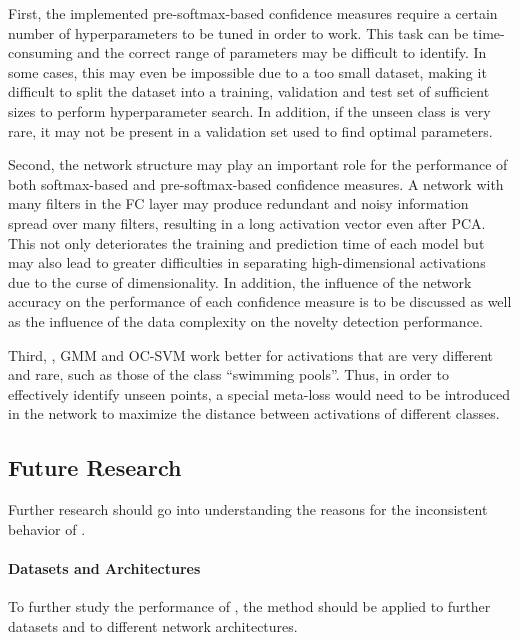\documentclass[10pt]{article}
\begin{document}
\label{subsec:limitaitons}
First, the implemented pre-softmax-based confidence measures require a certain number of hyperparameters to be tuned in order to work. This task can be time-consuming and the correct range of parameters may be difficult to identify. In some cases, this may even be impossible due to a too small dataset, making it difficult to split the dataset into a training, validation and test set of sufficient sizes to perform hyperparameter search. In addition, if the unseen class is very rare, it may not be present in a validation set used to find optimal parameters.

Second, the network structure may play an important role for the performance of both softmax-based and pre-softmax-based confidence measures. A network with many filters in the \gls{FC} layer may produce redundant and noisy information spread over many filters, resulting in a long activation vector even after \gls{PCA}. This not only deteriorates the training and prediction time of each model but may also lead to greater difficulties in separating high-dimensional activations due to the curse of dimensionality. In addition, the influence of the network accuracy on the performance of each confidence measure is to be discussed as well as the influence of the data complexity on the novelty detection performance.

Third, , \gls{GMM} and \gls{OC-SVM} work better for activations that are very different and rare, such as those of the class ``swimming pools''. Thus, in order to effectively identify unseen points, a special meta-loss would need to be introduced in the network to maximize the distance between activations of different classes.


\subsection{Future Research}
\label{subsec:future_research}

Further research should go into understanding the reasons for the inconsistent behavior of . 

\paragraph{Datasets and Architectures} To further study the performance of , the method should be applied to further datasets and to different network architectures.
\end{document}
